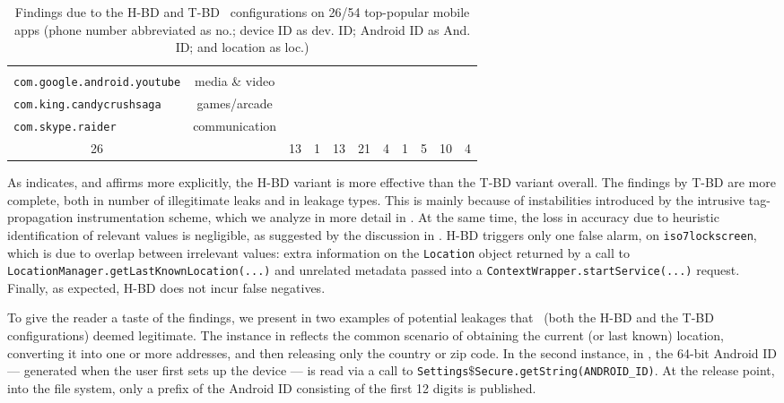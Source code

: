 \begin{table}
\begin{small}
\begin{center}
\begin{tabular}{l|c|c|c|c|c|c|c|c|c|c}
             	             &     	&  		 \checkmark			& &
	             			 & & \checkmark   & \\
	   	{\tt com.google.android.youtube}				& media \& video		& 		      		& 
		     	             &     	&  		 \checkmark			& &
			              & &  \checkmark   & \\
	{\tt com.king.candycrushsaga}					& games/arcade 		& 		      		&
	   &     	&  		 \checkmark			& & & &    & \\
	{\tt com.skype.raider} 						& communication 			& 		      		&
	   &     	&  		 \checkmark			& &
	   & 		&    		\checkmark			& \\
	\hline \hline
	\multicolumn{1}{c|}{26} & & 13 & 1 & 13 & 21 & 4 & 1 & 5 & 10 & 4 \\
	\end{tabular}
	\end{center}
	\caption{\label{Ta:realworld}Findings due to the H-BD and T-BD \Tool\ configurations on 26/54 top-popular mobile apps (phone number abbreviated as no.; device 
	ID as dev. ID; Android ID as And. ID;  and location as loc.)}
\end{small}
\end{table} 

As  indicates, and  affirms more explicitly, the H-BD variant is more effective than the T-BD variant overall. The findings by T-BD are more complete, both in number of illegitimate leaks and in leakage types. This is mainly because of instabilities introduced by the intrusive tag-propagation instrumentation scheme, which we analyze in more detail in .
At the same time, the loss in accuracy due to heuristic identification of relevant values is negligible, as suggested by the discussion in . H-BD triggers only one false alarm, on {\tt iso7lockscreen},
which is due to overlap between irrelevant values: extra information on the {\tt Location} object returned by a call to {\tt LocationManager.getLastKnownLocation(...)} and unrelated metadata passed into a {\tt ContextWrapper.startService(...)} request.  Finally, as expected, H-BD does not incur false negatives.

To give the reader a taste of the findings, we present in  two examples of potential leakages that \Tool\ (both the H-BD and the T-BD configurations) deemed legitimate. The instance in  reflects the common scenario of obtaining the current (or last known) location, converting it into one or more addresses, and then releasing only the country or zip code. In the second instance, in , the 64-bit Android ID --- generated when the user first sets up the device --- is read via a call to \texttt{Settings$\$$Secure.getString(ANDROID\_ID)}. At the release point, into the file system, only a prefix of the Android ID consisting of the first 12 digits is published.   


